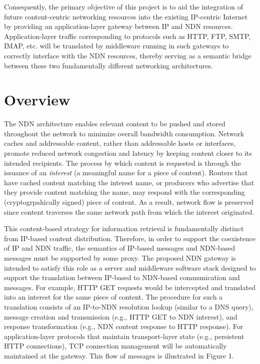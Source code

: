 \documentclass[10pt]{article}
\begin{document}
Consequently, the primary objective of this project is to aid the integration of future content-centric networking resources into the existing IP-centric Internet by providing an application-layer gateway between IP and NDN resources. Application-layer traffic corresponding to protocols such as HTTP, FTP, SMTP, IMAP, etc. will be translated by middleware running in such gateways to correctly interface with the NDN resources, thereby serving as a semantic bridge between these two fundamentally different networking architectures. 

\section{Overview}
The NDN architecture enables relevant content to be pushed and stored throughout the network to minimize overall bandwidth consumption. Network caches and addressable content, rather than addressable hosts or interfaces, promote reduced network congestion and latency by keeping content closer to its intended recipients. The process by which content is requested is through the issuance of an \emph{interest} (a meaningful name for a piece of content). Routers that have cached content matching the interest name, or producers who advertise that they provide content matching the name, may respond with the corresponding (cryptogrpahically signed) piece of content. As a result, network flow is preserved since content traverses the same network path from which the interest originated. 

This content-based strategy for information retrieval is fundamentally distinct from IP-based content distribution. Therefore, in order to support the coexistence of IP and NDN traffic, the semantics of IP-based messages and NDN-based messages must be supported by some proxy. The proposed NDN gateway is intended to satisfy this role as a server and middleware software stack designed to support the translation between IP-based to NDN-based communication and messages. For example, HTTP GET requests would be intercepted and translated into an interest for the same piece of content. The procedure for such a translation consists of an IP-to-NDN resolution lookup (similar to a DNS query), message creation and transmission (e.g., HTTP GET to NDN interest), and response transformation (e.g., NDN content response to HTTP response). For application-layer protocols that maintain transport-layer state (e.g., persistent HTTP connections), TCP connection management will be automatically maintained at the gateway. This flow of messages is illustrated in Figure 1. 
\end{document}
